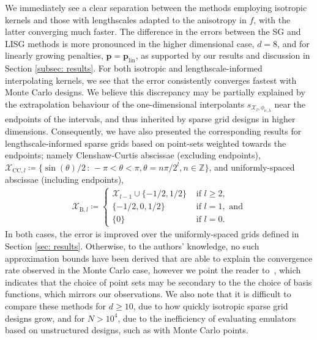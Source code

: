 \documentclass[pdflatex,sn-mathphys-num]{sn-jnl}%
\theoremstyle{thmstyleone}%
\theoremstyle{thmstyletwo}%
\theoremstyle{thmstylethree}%
\begin{document}
We immediately see a clear separation between the methods employing isotropic kernels and those with lengthscales adapted to the anisotropy in \(f\), with the latter converging much faster. The difference in the errors between the SG and LISG methods is more pronounced in the higher dimensional case, \(d=8\), and for linearly growing penalties, \(\mathbf{p}=\mathbf{p}_{\textrm{lin}}\), as supported by our results and discussion in Section \ref{subsec: results}. For both isotropic and lengthscale-informed interpolating kernels, we see that the error consistently converges fastest with Monte Carlo designs. We believe this discrepancy may be partially explained by the extrapolation behaviour of the one-dimensional interpolants \(s_{\mathcal{X}_l,\phi_{\nu,\lambda}}\) near the endpoints of the intervals, and thus inherited by sparse grid designs in higher dimensions. Consequently, we have also presented the corresponding results for lengthscale-informed sparse grids based on point-sets weighted towards the endpoints; namely Clenshaw-Curtis abscissae (excluding endpoints), \(\mathcal{X}_{\textrm{CC},l}\coloneqq\{\sin(\theta)/2\,:\,-\pi<\theta<\pi, \theta=n\pi/2^{l} ,n\in\mathbb{Z}\}\), and uniformly-spaced abscissae (including endpoints),
\begin{align}
    \mathcal{X}_{\textrm{B},l}\coloneqq\begin{cases}
        \mathcal{X}_{l-1}\cup\{-1/2,1/2\}&\textrm{ if } l\geq 2,\\
        \{-1/2,0,1/2\}&\textrm{ if } l=1, \textrm{ and}\\
        \{0\}&\textrm{ if } l=0.
    \end{cases}\nonumber
\end{align}
In both cases, the error is improved over the uniformly-spaced grids defined in Section \ref{sec: results}. Otherwise, to the authors' knowledge, no such approximation bounds have been derived that are able to explain the convergence rate observed in the Monte Carlo case, however we point the reader to~\cite{adcock2023montecarlogoodsampling}, which indicates that the choice of point sets may be secondary to the the choice of basis functions, which mirrors our observations. We also note that it is difficult to compare these methods for \(d\geq10\), due to how quickly isotropic sparse grid designs grow, and for \(N>10^4\), due to the inefficiency of evaluating emulators based on unstructured designs, such as with Monte Carlo points. 
\end{document}
